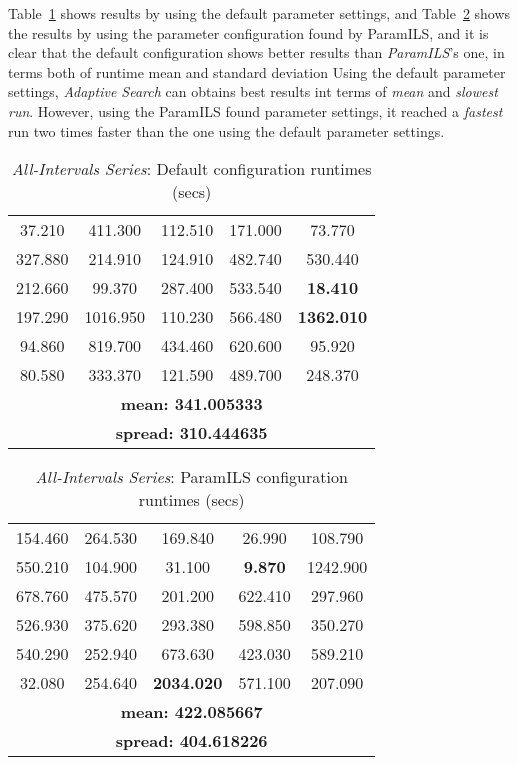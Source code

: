 Table~\ref{table:testaibad} shows results by using the default parameter settings, and Table~\ref{table:testaigood} shows the results by using the parameter configuration found by {\sc ParamILS}, and it is clear that the default configuration shows better results than {\it ParamILS}'s one, in terms both of runtime mean and standard deviation Using the default parameter settings, {\it Adaptive Search} can obtains best results int terms of {\it mean} and {\it slowest run}. However, using the {\sc ParamILS} found parameter settings, it reached a {\it fastest} run two times faster than the one using the default parameter settings. 

\begin{table}[h]
\centering
\renewcommand{\arraystretch}{1.2}
\begin{tabular}{|ccccc|}
	\hline
	37.210 & 411.300 & 112.510 & 171.000 & 73.770 \\ 
	327.880 & 214.910 & 124.910 & 482.740 & 530.440 \\  
	\hline 
	212.660 & 99.370 & 287.400 & 533.540 & \textcolor{naranja}{\bf 18.410} \\ 
	197.290 & 1016.950 & 110.230 & 566.480 & \textcolor{intenso}{\bf 1362.010} \\  
	\hline 
	94.860 & 819.700 & 434.460 & 620.600 & 95.920 \\ 
	80.580 & 333.370 & 121.590 & 489.700 & 248.370 \\  
	\hline 
	\multicolumn{5}{|c|}{\bf mean: 341.005333}\\
	\multicolumn{5}{|c|}{\bf spread: 310.444635}\\
	\hline
\end{tabular}
\caption{{\it All-Intervals Series}: Default configuration runtimes (secs)}\label{table:testaibad}
\end{table}
	
\begin{table}[h]
\centering
\renewcommand{\arraystretch}{1.2}
\begin{tabular}{|ccccc|}
	\hline
	154.460 & 264.530 & 169.840 & 26.990 & 108.790 \\ 
	550.210 & 104.900 & 31.100 & \textcolor{naranja}{\bf 9.870} & 1242.900 \\  
	\hline 
	678.760 & 475.570 & 201.200 & 622.410 & 297.960 \\ 
	526.930 & 375.620 & 293.380 & 598.850 & 350.270 \\  
	\hline 
	540.290 & 252.940 & 673.630 & 423.030 & 589.210 \\ 
	32.080 & 254.640 & \textcolor{intenso}{\bf 2034.020} & 571.100 & 207.090 \\  
	\hline 
	\multicolumn{5}{|c|}{\bf mean: 422.085667}\\
	\multicolumn{5}{|c|}{\bf spread: 404.618226}\\
	\hline
\end{tabular}
\caption{{\it All-Intervals Series}: {\sc ParamILS} configuration runtimes (secs)}\label{table:testaigood}
\end{table} 

